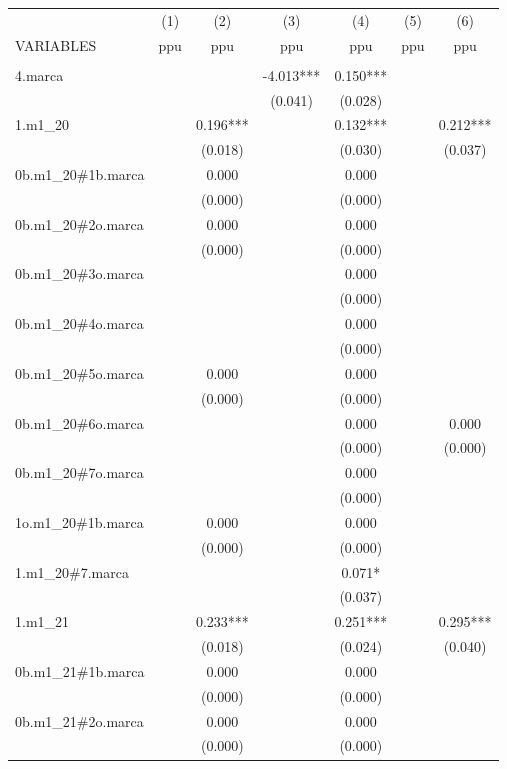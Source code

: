 \begin{tabular}{lcccccc} \hline
 & (1) & (2) & (3) & (4) & (5) & (6) \\
VARIABLES & ppu & ppu & ppu & ppu & ppu & ppu \\ \hline
 &  &  &  &  &  &  \\
4.marca &  &  & -4.013*** & 0.150*** &  &  \\
 &  &  & (0.041) & (0.028) &  &  \\
1.m1\_20 &  & 0.196*** &  & 0.132*** &  & 0.212*** \\
 &  & (0.018) &  & (0.030) &  & (0.037) \\
0b.m1\_20\#1b.marca &  & 0.000 &  & 0.000 &  &  \\
 &  & (0.000) &  & (0.000) &  &  \\
0b.m1\_20\#2o.marca &  & 0.000 &  & 0.000 &  &  \\
 &  & (0.000) &  & (0.000) &  &  \\
0b.m1\_20\#3o.marca &  &  &  & 0.000 &  &  \\
 &  &  &  & (0.000) &  &  \\
0b.m1\_20\#4o.marca &  &  &  & 0.000 &  &  \\
 &  &  &  & (0.000) &  &  \\
0b.m1\_20\#5o.marca &  & 0.000 &  & 0.000 &  &  \\
 &  & (0.000) &  & (0.000) &  &  \\
0b.m1\_20\#6o.marca &  &  &  & 0.000 &  & 0.000 \\
 &  &  &  & (0.000) &  & (0.000) \\
0b.m1\_20\#7o.marca &  &  &  & 0.000 &  &  \\
 &  &  &  & (0.000) &  &  \\
1o.m1\_20\#1b.marca &  & 0.000 &  & 0.000 &  &  \\
 &  & (0.000) &  & (0.000) &  &  \\
1.m1\_20\#7.marca &  &  &  & 0.071* &  &  \\
 &  &  &  & (0.037) &  &  \\
1.m1\_21 &  & 0.233*** &  & 0.251*** &  & 0.295*** \\
 &  & (0.018) &  & (0.024) &  & (0.040) \\
0b.m1\_21\#1b.marca &  & 0.000 &  & 0.000 &  &  \\
 &  & (0.000) &  & (0.000) &  &  \\
0b.m1\_21\#2o.marca &  & 0.000 &  & 0.000 &  &  \\
 &  & (0.000) &  & (0.000) &  &  \\

\end{tabular}
